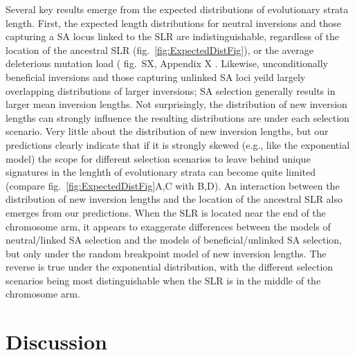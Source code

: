 \documentclass{article}[12pt]
\newcommand\hl[1]{%
  \bgroup
  \hskip0pt\color{blue!80!black}%
  #1%
  \egroup
}
\begin{document}
Several key results emerge from the expected distributions of evolutionary strata length. First, the expected length distributions for neutral inversions and those capturing a SA locus linked to the SLR are indistinguishable, regardless of the location of the ancestral SLR (fig.~\ref{fig:ExpectedDistFig}), or the average deleterious mutation load (\hl{fig.~SX, Appendix X}. Likewise, unconditionally beneficial inversions and those capturing unlinked SA loci yeild largely overlapping distributions of larger inversions; SA selection generally results in larger mean inversion lengths. Not surprisingly, the distribution of new inversion lengths can strongly influence the resulting distributions are under each selection scenario. Very little about the distribution of new inversion lengths, but our predictions clearly indicate that if it is strongly skewed (e.g., like the exponential model) the scope for different selection scenarios to leave behind unique signatures in the lenghth of evolutionary strata can become quite limited (compare fig.~\ref{fig:ExpectedDistFig}A,C with B,D). An interaction between the distribution of new inversion lengths and the location of the ancestral SLR also emerges from our predictions. When the SLR is located near the end of the chromosome arm, it appears to exaggerate differences between the models of neutral/linked SA selection and the models of beneficial/unlinked SA selection, but only under the random breakpoint model of new inversion lengths. The reverse is true under the exponential distribution, with the different selection scenarios being most distinguishable when the SLR is in the middle of the chromosome arm. 




\section*{Discussion} \label{sec:Discussion}


\end{document}
